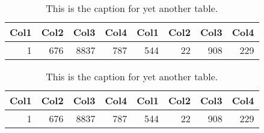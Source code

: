 \begin{table}
	\centering
	\begin{tabular}{r r r r r r r r}
		Col1 & Col2 & Col3 & Col4 & Col1 & Col2 & Col3 & Col4 \\
		\hline
		1    & 676  & 8837 & 787  & 544  & 22   & 908  & 229  \\
		\hline
	\end{tabular}
	\caption{This is the caption for yet another table.}
\end{table}
\begin{table}
	\centering
	\begin{tabular}{r r r r r r r r}
		Col1 & Col2 & Col3 & Col4 & Col1 & Col2 & Col3 & Col4 \\
		\hline
		1    & 676  & 8837 & 787  & 544  & 22   & 908  & 229  \\
		\hline
	\end{tabular}
	\caption{This is the caption for yet another table.}
\end{table}
